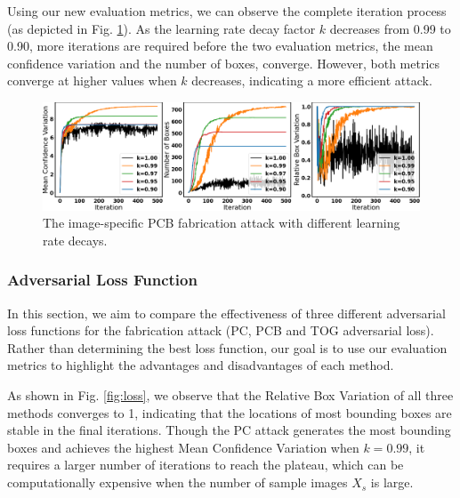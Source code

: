 Using our new evaluation metrics, we can observe the complete iteration process (as depicted in Fig. \ref{fig:decay}). As the learning rate decay factor $k$ decreases from 0.99 to 0.90, more iterations are required before the two evaluation metrics, the mean confidence variation and the number of boxes, converge. However, both metrics converge at higher values when $k$ decreases, indicating a more efficient attack. 


\begin{figure}[H]
    \centering
    \includegraphics[width=\linewidth]{figures/chapter_detection/hardware/lr.png}
    \caption{The  image-specific  PCB fabrication attack with different learning rate decays.}
    \label{fig:decay}
\end{figure}


\subsubsection{Adversarial Loss Function}

In this section, we aim to compare the effectiveness of three different adversarial loss functions for the fabrication attack (PC, PCB and TOG adversarial loss). Rather than determining the best loss function, our goal is to use our evaluation metrics to highlight the advantages and disadvantages of each method.


As shown in Fig. \ref{fig:loss}, we observe that the Relative Box Variation of all three methods converges to 1, indicating that the locations of most bounding boxes are stable in the final iterations. Though the PC attack generates the most bounding boxes and achieves the highest Mean Confidence Variation when $k=0.99$, it requires a larger number of iterations to reach the plateau, which can be computationally expensive when the number of sample images $X_{s}$ is large.

